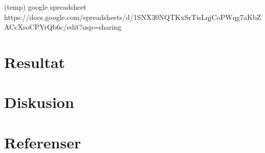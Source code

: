\documentclass[11p]{article}
\begin{document}
    (temp) google spreadsheet https://docs.google.com/spreadsheets/d/1SNX30NQTKxSrTisLqjCoPWqg7aKbZACcXsoCPYrQb6c/edit?usp=sharing
    \section{Resultat}
    
    \section{Diskusion}

    \section{Referenser}

    \printbibliography
\end{document}
